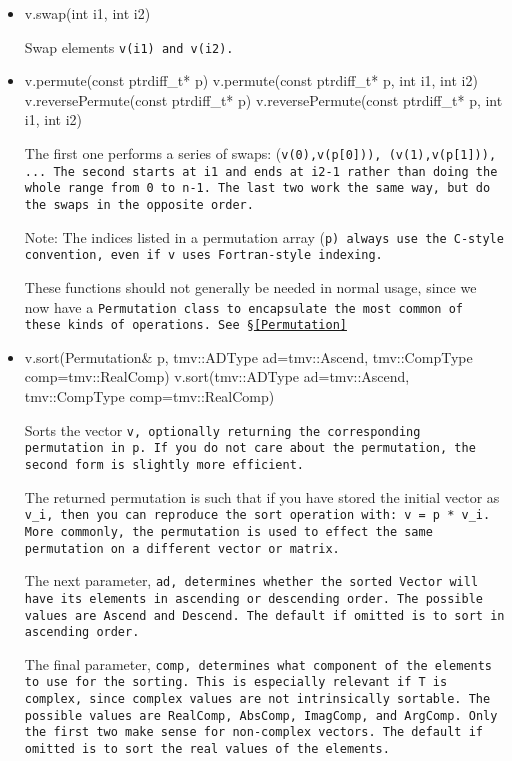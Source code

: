 \begin{itemize}
\item
\begin{tmvcode}
v.swap(int i1, int i2)
\end{tmvcode}
Swap elements \tt{v(i1)} and \tt{v(i2)}.

\item
\begin{tmvcode}
v.permute(const ptrdiff_t* p)
v.permute(const ptrdiff_t* p, int i1, int i2)
v.reversePermute(const ptrdiff_t* p)
v.reversePermute(const ptrdiff_t* p, int i1, int i2)
\end{tmvcode}
The first one performs a series of swaps: (\tt{v(0)},\tt{v(p[0])}), (\tt{v(1)},\tt{v(p[1])}), ... 
The second starts at \tt{i1} and ends at \tt{i2-1} rather than
doing the whole range from 0 to \tt{n-1}.
The last two work the same way, but do the swaps in the opposite order.

Note: The indices listed in a permutation array (\tt{p}) always use 
the C-style convention, even if \tt{v} uses Fortran-style indexing.

These functions should not generally be needed in normal usage, since we now 
have a \tt{Permutation} class to encapsulate the most common of these kinds of 
operations.  See \S\ref{Permutation}

\item
\begin{tmvcode}
v.sort(Permutation& p, tmv::ADType ad=tmv::Ascend, 
      tmv::CompType comp=tmv::RealComp)
v.sort(tmv::ADType ad=tmv::Ascend, 
      tmv::CompType comp=tmv::RealComp)
\end{tmvcode}
Sorts the vector \tt{v}, optionally returning the corresponding permutation in \tt{p}.
If you do not care about the permutation, the second form is slightly more efficient.

The returned permutation is such that if you have stored the initial vector as
\tt{v\_i}, then you can reproduce the sort operation with: \tt{v = p * v\_i}.
More commonly, the permutation is used to effect the same permutation on a 
different vector or matrix.

The next parameter, \tt{ad}, determines whether the sorted \tt{Vector} 
will have its elements in ascending or descending order.  The possible values
are \tt{Ascend} and \tt{Descend}.  The default if omitted is to sort
in ascending order.

The final parameter, \tt{comp}, determines what component of the
elements to use for the sorting.  This is especially relevant if T is complex, 
since complex values are not intrinsically sortable.
The possible values are
\tt{RealComp}, \tt{AbsComp},
\tt{ImagComp}, and \tt{ArgComp}.
Only the first two make sense for non-complex vectors.  The default if
omitted is to sort the real values of the elements.  


\end{itemize}
